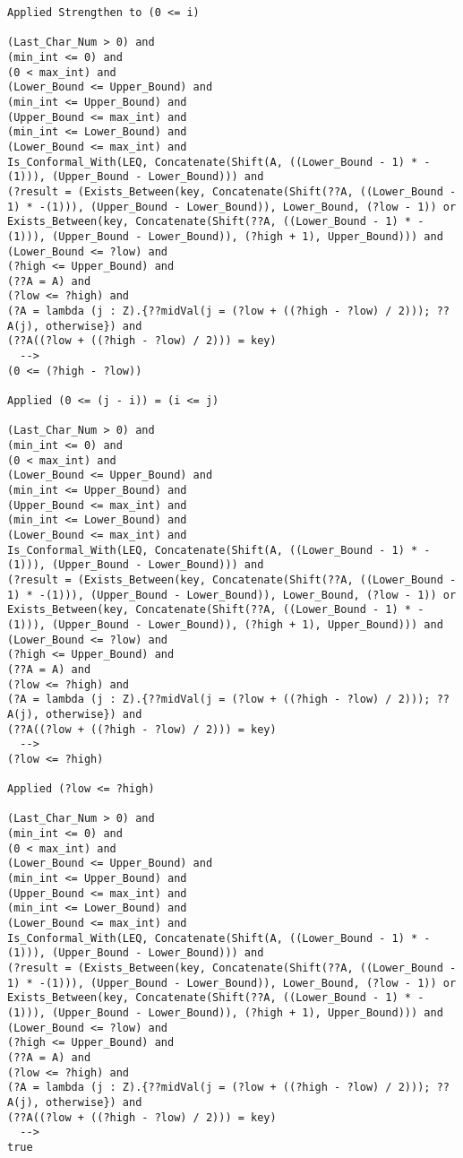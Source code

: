 \begin{lstlisting}[language=resolve]
Applied Strengthen to (0 <= i)

(Last_Char_Num > 0) and
(min_int <= 0) and
(0 < max_int) and
(Lower_Bound <= Upper_Bound) and
(min_int <= Upper_Bound) and
(Upper_Bound <= max_int) and
(min_int <= Lower_Bound) and
(Lower_Bound <= max_int) and
Is_Conformal_With(LEQ, Concatenate(Shift(A, ((Lower_Bound - 1) * -(1))), (Upper_Bound - Lower_Bound))) and
(?result = (Exists_Between(key, Concatenate(Shift(??A, ((Lower_Bound - 1) * -(1))), (Upper_Bound - Lower_Bound)), Lower_Bound, (?low - 1)) or Exists_Between(key, Concatenate(Shift(??A, ((Lower_Bound - 1) * -(1))), (Upper_Bound - Lower_Bound)), (?high + 1), Upper_Bound))) and
(Lower_Bound <= ?low) and
(?high <= Upper_Bound) and
(??A = A) and
(?low <= ?high) and
(?A = lambda (j : Z).{??midVal(j = (?low + ((?high - ?low) / 2))); ??A(j), otherwise}) and
(??A((?low + ((?high - ?low) / 2))) = key)
  -->
(0 <= (?high - ?low))

Applied (0 <= (j - i)) = (i <= j)

(Last_Char_Num > 0) and
(min_int <= 0) and
(0 < max_int) and
(Lower_Bound <= Upper_Bound) and
(min_int <= Upper_Bound) and
(Upper_Bound <= max_int) and
(min_int <= Lower_Bound) and
(Lower_Bound <= max_int) and
Is_Conformal_With(LEQ, Concatenate(Shift(A, ((Lower_Bound - 1) * -(1))), (Upper_Bound - Lower_Bound))) and
(?result = (Exists_Between(key, Concatenate(Shift(??A, ((Lower_Bound - 1) * -(1))), (Upper_Bound - Lower_Bound)), Lower_Bound, (?low - 1)) or Exists_Between(key, Concatenate(Shift(??A, ((Lower_Bound - 1) * -(1))), (Upper_Bound - Lower_Bound)), (?high + 1), Upper_Bound))) and
(Lower_Bound <= ?low) and
(?high <= Upper_Bound) and
(??A = A) and
(?low <= ?high) and
(?A = lambda (j : Z).{??midVal(j = (?low + ((?high - ?low) / 2))); ??A(j), otherwise}) and
(??A((?low + ((?high - ?low) / 2))) = key)
  -->
(?low <= ?high)

Applied (?low <= ?high)

(Last_Char_Num > 0) and
(min_int <= 0) and
(0 < max_int) and
(Lower_Bound <= Upper_Bound) and
(min_int <= Upper_Bound) and
(Upper_Bound <= max_int) and
(min_int <= Lower_Bound) and
(Lower_Bound <= max_int) and
Is_Conformal_With(LEQ, Concatenate(Shift(A, ((Lower_Bound - 1) * -(1))), (Upper_Bound - Lower_Bound))) and
(?result = (Exists_Between(key, Concatenate(Shift(??A, ((Lower_Bound - 1) * -(1))), (Upper_Bound - Lower_Bound)), Lower_Bound, (?low - 1)) or Exists_Between(key, Concatenate(Shift(??A, ((Lower_Bound - 1) * -(1))), (Upper_Bound - Lower_Bound)), (?high + 1), Upper_Bound))) and
(Lower_Bound <= ?low) and
(?high <= Upper_Bound) and
(??A = A) and
(?low <= ?high) and
(?A = lambda (j : Z).{??midVal(j = (?low + ((?high - ?low) / 2))); ??A(j), otherwise}) and
(??A((?low + ((?high - ?low) / 2))) = key)
  -->
true


\end{lstlisting}
